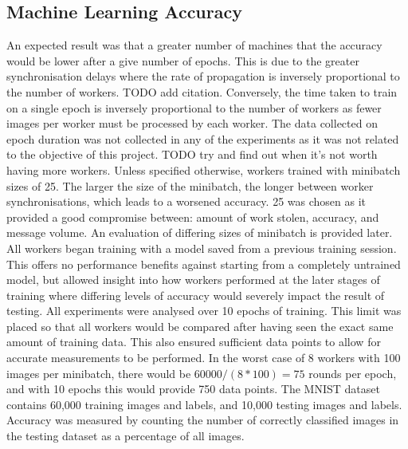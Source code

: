 \documentclass[12pt]{article}
\begin{document}
\subsection{Machine Learning Accuracy}
An expected result was that a greater number of machines that the accuracy would be lower after a give number of epochs. This is due to the greater synchronisation delays where the rate of propagation is inversely proportional to the number of workers. TODO add citation. Conversely, the time taken to train on a single epoch is inversely proportional to the number of workers as fewer images per worker must be processed by each worker. The data collected on epoch duration was not collected in any of the experiments as it was not related to the objective of this project. TODO try and find out when it's not worth having more workers.
\newline
\newline
Unless specified otherwise, workers trained with minibatch sizes of 25. The larger the size of the minibatch, the longer between worker synchronisations, which leads to a worsened accuracy. 25 was chosen as it provided a good compromise between: amount of work stolen, accuracy, and message volume. An evaluation of differing sizes of minibatch is provided later.
\newline
\newline
All workers began training with a model saved from a previous training session. This offers no performance benefits against starting from a completely untrained model, but allowed insight into how workers performed at the later stages of training where differing levels of accuracy would severely impact the result of testing.
\newline
\newline
All experiments were analysed over 10 epochs of training. This limit was placed so that all workers would be compared after having seen the exact same amount of training data. This also ensured sufficient data points to allow for accurate measurements to be performed. In the worst case of 8 workers with 100 images per minibatch, there would be $60000/(8*100) = 75$ rounds per epoch, and with 10 epochs this would provide 750 data points.
\newline
\newline
The MNIST dataset contains 60,000 training images and labels, and 10,000 testing images and labels. Accuracy was measured by counting the number of correctly classified images in the testing dataset as a percentage of all images.
\end{document}

